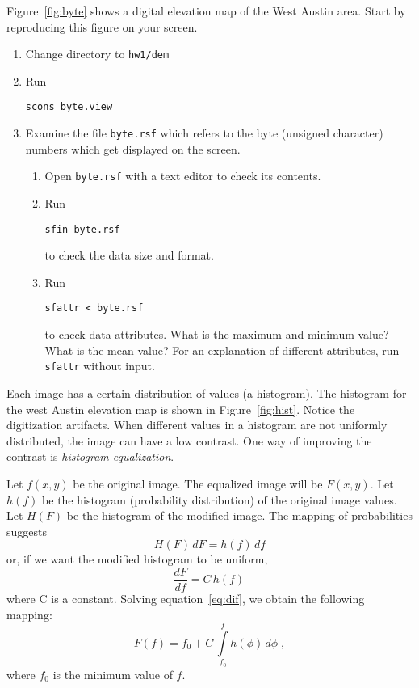 
Figure~\ref{fig:byte} shows a digital elevation map of the West Austin
area. Start by reproducing this figure on your screen.
\begin{enumerate}
\item Change directory to \verb#hw1/dem#
\item Run
\begin{verbatim}
scons byte.view
\end{verbatim}
\item Examine the file \texttt{byte.rsf} which refers to the 
byte (unsigned character) numbers which get displayed on the screen.
\begin{enumerate}
\item Open \texttt{byte.rsf} with a text editor to check its contents.
\item Run
\begin{verbatim}
sfin byte.rsf
\end{verbatim}
to check the data size and format.
\item Run
\begin{verbatim}
sfattr < byte.rsf
\end{verbatim}
to check data attributes. What is the maximum and minimum value? What
is the mean value? For an explanation of different attributes,
run \texttt{sfattr} without input.
\end{enumerate}
\end{enumerate}

Each image has a certain distribution of values (a histogram). The
histogram for the west Austin elevation map is shown in
Figure~\ref{fig:hist}. Notice the digitization artifacts. When
different values in a histogram are not uniformly distributed, the
image can have a low contrast. One way of improving the contrast is
\emph{histogram equalization}.


Let $f(x,y)$ be the original image. The equalized image will be
$F(x,y)$. Let $h(f)$ be the histogram (probability distribution) of
the original image values. Let $H(F)$ be the histogram of the modified
image. The mapping of probabilities suggests
\begin{equation}
\label{eq:prob}
H(F)\,dF = h(f)\,df
\end{equation}
or, if we want the modified histogram
to be uniform, 
\begin{equation}
\label{eq:dif}
\frac{d F}{d f} = C\,h(f)\,
\end{equation}
where C is a constant. 
Solving equation~\ref{eq:dif}, we obtain the following mapping:
\begin{equation}
\label{eq:int}
F(f) = f_0 + C\,\int\limits_{f_0}^f h(\phi)\,d\phi\;,
\end{equation}
where $f_0$ is the minimum value of $f$.

